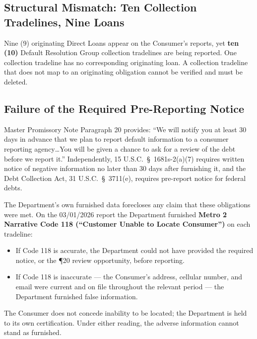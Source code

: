 \documentclass[12pt,letterpaper]{article}
\begin{document}
\subsection*{Structural Mismatch: Ten Collection Tradelines, Nine Loans}

Nine (9) originating Direct Loans appear on the Consumer's reports, yet \textbf{ten (10)} Default Resolution Group collection tradelines are being reported. One collection tradeline has no corresponding originating loan. A collection tradeline that does not map to an originating obligation cannot be verified and must be deleted.

\subsection*{Failure of the Required Pre-Reporting Notice}

Master Promissory Note Paragraph 20 provides: ``We will notify you at least 30 days in advance that we plan to report default information to a consumer reporting agency\ldots You will be given a chance to ask for a review of the debt before we report it.'' Independently, 15 U.S.C.\ \S~1681s-2(a)(7) requires written notice of negative information no later than 30 days after furnishing it, and the Debt Collection Act, 31 U.S.C.\ \S~3711(e), requires pre-report notice for federal debts.

The Department's own furnished data forecloses any claim that these obligations were met. On the 03/01/2026 report the Department furnished \textbf{Metro 2 Narrative Code 118 (``Customer Unable to Locate Consumer'')} on each tradeline:
\begin{itemize}[noitemsep]
  \item If Code 118 is accurate, the Department could not have provided the required notice, or the ¶20 review opportunity, before reporting.
  \item If Code 118 is inaccurate --- the Consumer's address, cellular number, and email were current and on file throughout the relevant period --- the Department furnished false information.
\end{itemize}
The Consumer does not concede inability to be located; the Department is held to its own certification. Under either reading, the adverse information cannot stand as furnished.
\end{document}
